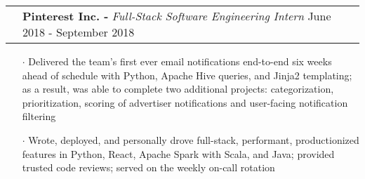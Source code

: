 \documentclass[a4paper, oneside, final]{scrartcl} %
\newcommand{\gray}{\rowcolor[gray]{.90}} %
\begin{document}
\begin{center}

  \vspace{-0.05cm}

  \begin{tabularx}{1.00\linewidth}{>{\raggedleft\scshape}p{0cm}X}
    \gray& \textbf{Pinterest Inc. -} \textit{Full-Stack Software Engineering Intern} \hfill {June 2018 - September 2018}\\
  \end{tabularx}
  \vspace{-0.5cm}
  \begin{itemize} \itemsep-0.2cm
      \vspace{-0.1cm}
    \item[$\cdot$] Delivered the team's first ever email notifications end-to-end six weeks ahead of schedule with Python, Apache Hive queries, and Jinja2 templating; as a result, was able to complete two additional projects: categorization, prioritization, scoring of advertiser notifications and user-facing notification filtering
    \item[$\cdot$] Wrote, deployed, and personally drove full-stack, performant, productionized features in Python, React, Apache Spark with Scala, and Java; provided trusted code reviews; served on the weekly on-call rotation
  \end{itemize}


\end{center}
\end{document}
